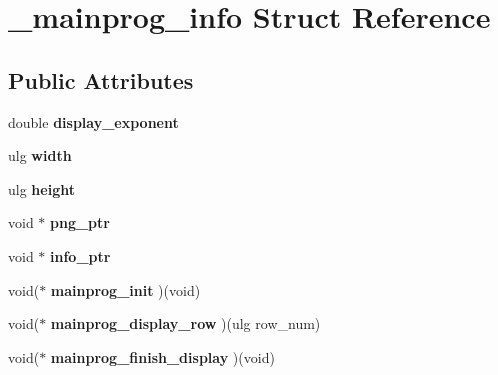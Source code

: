 \hypertarget{struct__mainprog__info}{\section{\-\_\-mainprog\-\_\-info Struct Reference}
\label{struct__mainprog__info}
}
\subsection*{Public Attributes}
\begin{DoxyCompactItemize}
\item 
\hypertarget{struct__mainprog__info_acc432fe80c5761bb0fb27c03a346b1f8}{double {\bfseries display\-\_\-exponent}}\label{struct__mainprog__info_acc432fe80c5761bb0fb27c03a346b1f8}

\item 
\hypertarget{struct__mainprog__info_a83eef09db07997f02e0e612663c23336}{ulg {\bfseries width}}\label{struct__mainprog__info_a83eef09db07997f02e0e612663c23336}

\item 
\hypertarget{struct__mainprog__info_aa45625593a0a10fb670c7421f4fabe6b}{ulg {\bfseries height}}\label{struct__mainprog__info_aa45625593a0a10fb670c7421f4fabe6b}

\item 
\hypertarget{struct__mainprog__info_ac0702618113cdf0fbd33d52088911650}{void $\ast$ {\bfseries png\-\_\-ptr}}\label{struct__mainprog__info_ac0702618113cdf0fbd33d52088911650}

\item 
\hypertarget{struct__mainprog__info_a0c4e34a41ce837b509bad44e728bb6fc}{void $\ast$ {\bfseries info\-\_\-ptr}}\label{struct__mainprog__info_a0c4e34a41ce837b509bad44e728bb6fc}

\item 
\hypertarget{struct__mainprog__info_a01ac80d404a2d6c63751eb024c29313f}{void($\ast$ {\bfseries mainprog\-\_\-init} )(void)}\label{struct__mainprog__info_a01ac80d404a2d6c63751eb024c29313f}

\item 
\hypertarget{struct__mainprog__info_a50e13ef970a90950dad70036dbd9ae91}{void($\ast$ {\bfseries mainprog\-\_\-display\-\_\-row} )(ulg row\-\_\-num)}\label{struct__mainprog__info_a50e13ef970a90950dad70036dbd9ae91}

\item 
\hypertarget{struct__mainprog__info_ab88fd83e8bfffb3e0e80a821781679b9}{void($\ast$ {\bfseries mainprog\-\_\-finish\-\_\-display} )(void)}\label{struct__mainprog__info_ab88fd83e8bfffb3e0e80a821781679b9}


\end{DoxyCompactItemize}
